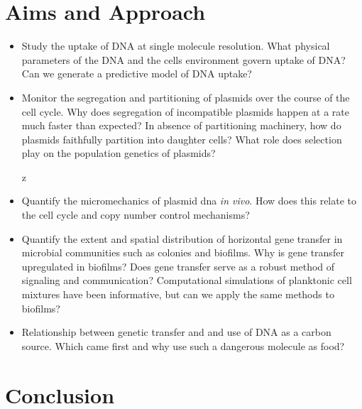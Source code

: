 \section*{Aims and Approach}
\begin{itemize} 
	\item Study the uptake of DNA at single molecule resolution.  What
		physical parameters of the DNA and the cells environment govern
		uptake of DNA? Can we generate a predictive model of DNA uptake?

	\item Monitor the segregation and partitioning of plasmids over the
		course of the cell cycle. Why does segregation of incompatible
		plasmids happen at a rate much faster than expected? In absence
		of partitioning machinery, how do plasmids faithfully partition
		into daughter cells? What role does selection play on the
		population genetics of plasmids?  

	z\item Quantify the micromechanics of plasmid dna \textit{in vivo}. How
		does this relate to the cell cycle and copy number control
		mechanisms?  

	\item Quantify the extent and spatial distribution of horizontal gene
		transfer in microbial communities such as colonies and biofilms.
		Why is gene transfer upregulated in biofilms? Does gene transfer
		serve as a robust method of signaling and communication?
		Computational simulations of planktonic cell mixtures have been
		informative, but can we apply the same methods to biofilms?  

	\item Relationship between genetic transfer and and use of DNA as a
		carbon source. Which came first and why use such a dangerous
		molecule as food?

\end{itemize}

\section*{Conclusion}




